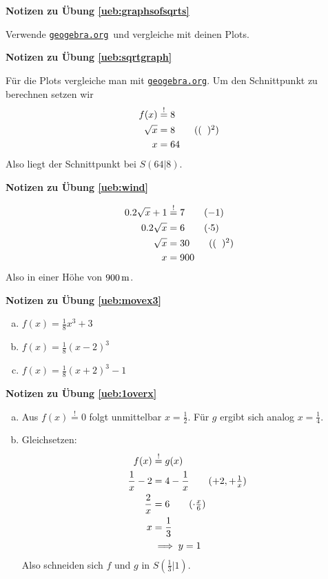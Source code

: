 \documentclass[%
<<<<<<< Updated upstream
11pt,%
twoside,%
titlepage,%
german,%
=======
11pt,%
twoside,%
titlepage,%
swissgerman,%
>>>>>>> Stashed changes
headsepline%
]{scrartcl}
\newcommand{\geogebralink}{\href{https://www.geogebra.org/calculator}{\texttt{geogebra.org}}}
\newcommand{\faReturnGray}{\textcolor{gray}{\faMailReply}} %
\newcommand{\geogebralink}{\href{https://www.geogebra.org/calculator}{\texttt{geogebra.org}}}
\theoremstyle{definition}
\theoremstyle{plain}
\newcommand{\concatueb}[1]{ueb:#1}%
\newcommand{\concatlsg}[1]{lsg:#1}%
\newenvironment{lsg}[1]{%
    \par\noindent\textbf{Notizen zu Übung \ref{\concatueb{#1}}}\label{\concatlsg{#1}}
    \hfill\hyperref[\concatueb{#1}]{\faReturnGray}\par %
}{%
    \par%
}
\newcommand{\concatueb}[1]{ueb:#1}%
\newcommand{\concatlsg}[1]{lsg:#1}%
\newenvironment{lsg}[1]{%
    \par\noindent\textbf{Notizen zu Übung \ref{\concatueb{#1}}.}%
    \label{\concatlsg{#1}}
}{%
    \par%
}
\begin{document}
\begin{lsg}{graphsofsqrts}
  Verwende \geogebralink\   und vergleiche mit deinen Plots.
\end{lsg}

\begin{lsg}{sqrtgraph}
  Für die Plots vergleiche man mit \geogebralink . Um den Schnittpunkt zu berechnen setzen wir
  \begin{align*}
    f(x) &\stackrel{!}{=} 8\\
    \sqrt{x} &= 8\tag{$(\phantom{x})^2$}\\
    x &= 64
  \end{align*}
  Also liegt der Schnittpunkt bei $S(64|8)$.
\end{lsg}

\begin{lsg}{wind}
  \begin{align*}
    0.2\sqrt{x}+1 &\stackrel{!}{=} 7\tag{$-1$}\\
    0.2\sqrt{x} &= 6\tag{$\cdot5$}\\
    \sqrt{x} &= 30\tag{$(\phantom{x})^2$}\\
    x &= 900
  \end{align*}
  Also in einer Höhe von $\unit[900]{m}$.
\end{lsg}

\begin{lsg}{movex3}
  \begin{enumerate}[a)]
    \item $f(x)=\frac{1}{8}x^3+3$
    \item $f(x)=\frac{1}{8}(x-2)^3$
    \item $f(x)=\frac{1}{8}(x+2)^3-1$
  \end{enumerate}
\end{lsg}

\begin{lsg}{1overx}
  \begin{enumerate}[a)]
    \item Aus $f(x)\stackrel{!}{=}0$ folgt unmittelbar $x=\frac{1}{2}$. Für $g$ ergibt sich analog $x=\frac{1}{4}$.
    \item Gleichsetzen:
    \begin{align*}
      f(x)&\stackrel{!}{=} g(x)\\
      \frac{1}{x}-2 &= 4-\frac{1}{x}\tag{$+2,+\frac{1}{x}$}\\
      \frac{2}{x} &= 6\tag{$\cdot\frac{x}{6}$}\\
      x &= \frac{1}{3}\\
      &\implies y=1
    \end{align*}
    Also schneiden sich $f$ und $g$ in $S(\frac{1}{3}|1)$.
  \end{enumerate}
\end{lsg}
\end{document}
